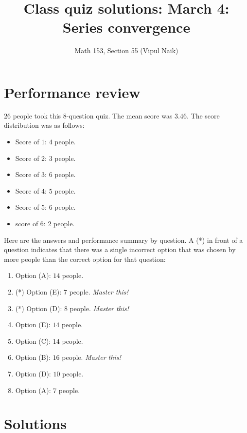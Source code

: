 \documentclass[10pt]{amsart}
\title{Class quiz solutions: March 4: Series convergence}
\author{Math 153, Section 55 (Vipul Naik)}
\begin{document}
\maketitle

\section{Performance review}

$26$ people took this $8$-question quiz. The mean score was
$3.46$. The score distribution was as follows:

\begin{itemize}
\item Score of $1$: $4$ people.
\item Score of $2$: $3$ people.
\item Score of $3$: $6$ people.
\item Score of $4$: $5$ people.
\item Score of $5$: $6$ people.
\item score of $6$: $2$ people.
\end{itemize}

Here are the answers and performance summary by question. A (*) in
front of a question indicates that there was a single incorrect option
that was chosen by more people than the correct option for that
question:

\begin{enumerate}
\item Option (A): $14$ people.
\item (*) Option (E): $7$ people. {\em Master this!}
\item (*) Option (D): $8$ people. {\em Master this!}
\item Option (E): $14$ people.
\item Option (C): $14$ people.
\item Option (B): $16$ people. {\em Master this!}
\item Option (D): $10$ people.
\item Option (A): $7$ people.
\end{enumerate}

\section{Solutions}
\end{document}
